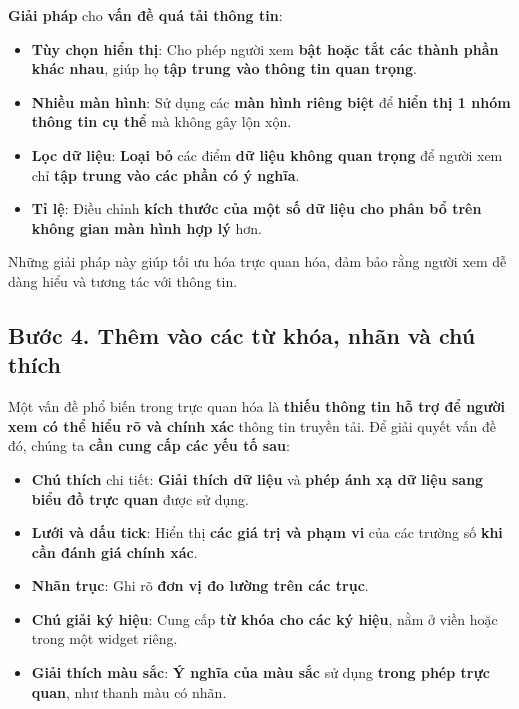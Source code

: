 \textbf{Giải pháp} cho \textbf{vấn đề quá tải thông tin}:

\begin{itemize}
\tightlist
\item
  \textbf{Tùy chọn hiển thị}: Cho phép người xem \textbf{bật hoặc tắt
  các thành phần khác nhau}, giúp họ \textbf{tập trung vào thông tin
  quan trọng}.
\item
  \textbf{Nhiều màn hình}: Sử dụng các \textbf{màn hình riêng biệt} để
  \textbf{hiển thị 1 nhóm thông tin cụ thể} mà không gây lộn xộn.
\item
  \textbf{Lọc dữ liệu}: \textbf{Loại bỏ} các điểm \textbf{dữ liệu không
  quan trọng} để người xem chỉ \textbf{tập trung vào các phần có ý
  nghĩa}.
\item
  \textbf{Tỉ lệ}: Điều chỉnh \textbf{kích thước của một số dữ liệu cho
  phân bổ trên không gian màn hình hợp lý} hơn.
\end{itemize}

Những giải pháp này giúp tối ưu hóa trực quan hóa, đảm bảo rằng người
xem dễ dàng hiểu và tương tác với thông tin.

\subsection{Bước 4. Thêm vào các từ khóa, nhãn và chú
thích}\label{bux1b0ux1edbc-4.-thuxeam-vuxe0o-cuxe1c-tux1eeb-khuxf3a-nhuxe3n-vuxe0-chuxfa-thuxedch}

Một vấn đề phổ biến trong trực quan hóa là \textbf{thiếu thông tin hỗ
trợ để người xem có thể hiểu rõ và chính xác} thông tin truyền tải. Để
giải quyết vấn đề đó, chúng ta \textbf{cần cung cấp các yếu tố sau}:

\begin{itemize}
\tightlist
\item
  \textbf{Chú thích} chi tiết: \textbf{Giải thích dữ liệu} và
  \textbf{phép ánh xạ dữ liệu sang biểu đồ trực quan} được sử dụng.
\item
  \textbf{Lưới và dấu tick}: Hiển thị \textbf{các giá trị và phạm vi}
  của các trường số \textbf{khi cần đánh giá chính xác}.
\item
  \textbf{Nhãn trục}: Ghi rõ \textbf{đơn vị đo lường trên các trục}.
\item
  \textbf{Chú giải ký hiệu}: Cung cấp \textbf{từ khóa cho các ký hiệu},
  nằm ở viền hoặc trong một widget riêng.
\item
  \textbf{Giải thích màu sắc}: \textbf{Ý nghĩa của màu sắc} sử dụng
  \textbf{trong phép trực quan}, như thanh màu có nhãn.
\end{itemize}

